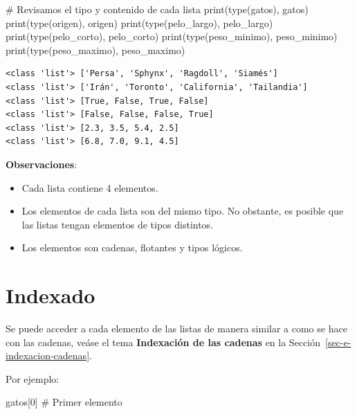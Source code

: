 \documentclass[
  spanish,
  letterpaper,
]{scrbook}
\newenvironment{Shaded}{\begin{snugshade}}{\end{snugshade}}
\newcommand{\BuiltInTok}[1]{\textcolor[rgb]{0.00,0.23,0.31}{#1}}
\newcommand{\CommentTok}[1]{\textcolor[rgb]{0.37,0.37,0.37}{#1}}
\newcommand{\DecValTok}[1]{\textcolor[rgb]{0.68,0.00,0.00}{#1}}
\newcommand{\NormalTok}[1]{\textcolor[rgb]{0.00,0.23,0.31}{#1}}
\providecommand{\tightlist}{%
  \setlength{\itemsep}{0pt}\setlength{\parskip}{0pt}}
\theoremstyle{definition}
\theoremstyle{remark}
\begin{document}
\begin{Shaded}
\begin{Highlighting}[]
\CommentTok{\# Revisamos el tipo y contenido de cada lista}
\BuiltInTok{print}\NormalTok{(}\BuiltInTok{type}\NormalTok{(gatos), gatos)}
\BuiltInTok{print}\NormalTok{(}\BuiltInTok{type}\NormalTok{(origen), origen)}
\BuiltInTok{print}\NormalTok{(}\BuiltInTok{type}\NormalTok{(pelo\_largo), pelo\_largo)}
\BuiltInTok{print}\NormalTok{(}\BuiltInTok{type}\NormalTok{(pelo\_corto), pelo\_corto)}
\BuiltInTok{print}\NormalTok{(}\BuiltInTok{type}\NormalTok{(peso\_minimo), peso\_minimo)}
\BuiltInTok{print}\NormalTok{(}\BuiltInTok{type}\NormalTok{(peso\_maximo), peso\_maximo)}
\end{Highlighting}
\end{Shaded}

\begin{verbatim}
<class 'list'> ['Persa', 'Sphynx', 'Ragdoll', 'Siamés']
<class 'list'> ['Irán', 'Toronto', 'California', 'Tailandia']
<class 'list'> [True, False, True, False]
<class 'list'> [False, False, False, True]
<class 'list'> [2.3, 3.5, 5.4, 2.5]
<class 'list'> [6.8, 7.0, 9.1, 4.5]
\end{verbatim}

\textbf{Observaciones}:

\begin{itemize}
\tightlist
\item
  Cada lista contiene 4 elementos.
\item
  Los elementos de cada lista son del mismo tipo. No obstante, es
  posible que las listas tengan elementos de tipos distintos.
\item
  Los elementos son cadenas, flotantes y tipos lógicos.
\end{itemize}

\section{Indexado}\label{indexado}

Se puede acceder a cada elemento de las listas de manera similar a como
se hace con las cadenas, veáse el tema \textbf{Indexación de las
cadenas} en la Sección~\ref{sec-e-indexacion-cadenas}.

Por ejemplo:

\begin{Shaded}
\begin{Highlighting}[]
\NormalTok{gatos[}\DecValTok{0}\NormalTok{] }\CommentTok{\# Primer elemento}
\end{Highlighting}
\end{Shaded}
\end{document}
